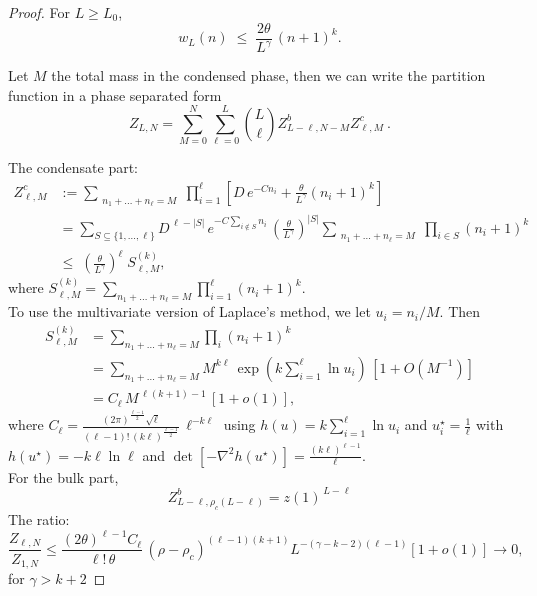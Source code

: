\documentclass[10pt,a4paper]{amsart}
\begin{document}
\begin{proof}
    For $L\ge L_0$,
	\[
	w_L(n)\;\le\;\frac{2\theta}{L^{\gamma}}\,(n+1)^{k}.
	\]




    Let $M$ the total mass in the condensed phase, then we can write the partition function in a phase separated form 
    \[
    Z_{L,N} =\sum_{M=0}^N \sum_{\ell=0}^L {L\choose \ell} Z^b_{L-\ell,N-M} Z^c_{\ell,M} \ .
    \]

The condensate part: 
\begin{equation*}
\begin{aligned}
Z^c_{\ell,M}
& :=\!
\sum_{\substack{n_1+\dots+n_\ell=M}}
\prod_{i=1}^{\ell}\!
\left[D\,e^{-C n_i}
+\frac{\theta}{L^{\gamma}}(n_i+1)^k\right]\\
&= \sum_{S\subseteq\{1,\dots,\ell\}}
	D^{\,\ell-|S|}\,e^{-C\sum_{i\notin S}n_i}\,
	\left(\frac{\theta}{L^{\gamma}}\right)^{\!|S|}
	\!\!\sum_{\substack{n_1+\dots+n_{\ell}=M}}
	\prod_{i\in S}(n_i+1)^k \\
& \leq\;
	\left(\frac{\theta}{L^{\gamma}}\right)^{\ell}\;
	S_{\ell,M}^{(k)},
\end{aligned}
\end{equation*}
where $	S_{\ell,M}^{(k)}=
	\sum_{n_1+\dots+n_{\ell}=M}\prod_{i=1}^{\ell}(n_i+1)^k $.\\
    
To use the multivariate version of Laplace's method, we let $u_i=n_i/M$. Then
\begin{equation*}
\begin{aligned}
S_{\ell,M}^{(k)} 
&= \sum_{n_1+\dots+n_{\ell}=M}\prod_{i} (n_i+1)^k \\
&= \sum_{n_1+\dots+n_{\ell}=M} M^{k\ell}\,
\exp \left(k\sum_{i=1}^{\ell}\ln u_i\right)
\,[1+O(M^{-1})] \\
&=  C_\ell\,M^{\,\ell(k+1)-1}\,[1+o(1)],
\end{aligned}
\end{equation*}
where $C_\ell=\frac{(2\pi)^{\frac{\ell-1}{2}}\sqrt{\ell}}
{(\ell-1)!\,(k\ell)^{\frac{\ell-1}{2}}}\,
\ell^{-k\ell}$ using $h(u)=k\sum_{i=1}^{\ell}\ln u_i$ and 
$u^\star_i=\frac1\ell$ with
$h(u^\star)=-k\ell\ln\ell$ and 
$\det\left[ -\nabla^2 h(u^\star )\right] =\frac{(k\ell)^{\ell-1}}{\ell}$. \\

For the bulk part,
\[
Z^b_{L-\ell,\rho_c(L-\ell)}=z(1)^{\,L-\ell}
\]
The ratio:
\[
\frac{Z_{\ell,N}}{Z_{1,N}}
\le
\frac{(2\theta)^{\ell-1}C_\ell}{\ell!\,\theta}\,
(\rho-\rho_c)^{(\ell-1)(k+1)}
L^{-(\gamma-k-2)(\ell-1)}[1+o(1)]
\to0,
\]
for $\gamma>k+2$


\end{proof}
\end{document}
